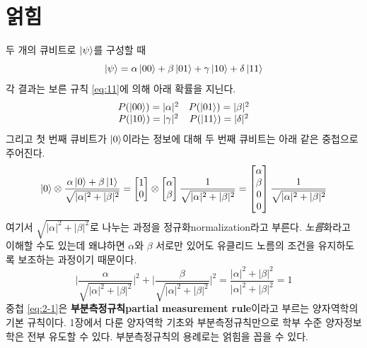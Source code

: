 \documentclass[a4paper,chapter,atbegshi]{oblivoir}
\begin{document}
\chapter{얽힘}
두 개의 큐비트로 $\ket{\psi}$를 구성할 때
\[
  \ket{\psi} = \alpha\ket{00}+\beta\ket{01}+\gamma\ket{10}+\delta\ket{11}
\]
각 결과는 보른 규칙 \ref{eq:11}에 의해 아래 확률을 지닌다. 
\[\begin{matrix}
  P(\ket{00})=|\alpha|^2 & P(\ket{01})=|\beta|^2 \\
  P(\ket{10})=|\gamma|^2 & P(\ket{11})=|\delta|^2
\end{matrix}\]
그리고 첫 번째 큐비트가 $\ket{0}$이라는 정보에 대해 두 번째 큐비트는 아래
같은 중첩으로 주어진다.
\begin{equation}\label{eq:2-1}
  \ket0\otimes\frac{\alpha\ket0+\beta\ket1}{\sqrt{|\alpha|^2+|\beta|^2}}
  = \begin{bmatrix}1\\0\end{bmatrix}\otimes
  \begin{bmatrix}\alpha\\\beta\end{bmatrix}\frac{1}{\sqrt{|\alpha|^2+|\beta|^2}}
  = \begin{bmatrix}\alpha\\\beta\\0\\0\end{bmatrix}\frac{1}{\sqrt{|\alpha|^2+|\beta|^2}}
\end{equation}
여기서 $\sqrt{|\alpha|^2+|\beta|^2}$로 나누는 과정을 
정규화{\tiny normalization}라고
부른다. \emph{노름}화라고 이해할 수도 있는데 왜냐하면 $\alpha$와 $\beta$ 서로만
있어도 유클리드 노름의 조건을 유지하도록 보조하는 과정이기 때문이다. 
\[
  \Bigg\lvert\frac{\alpha}{\sqrt{|\alpha|^2+|\beta|^2}}\Bigg\rvert^2 +
  \Bigg\lvert\frac{\beta}{\sqrt{|\alpha|^2+|\beta|^2}}\Bigg\rvert^2
  =
  \frac{|\alpha|^2+|\beta|^2}{|\alpha|^2+|\beta|^2}=1
\]
중첩 \ref{eq:2-1}은 \textbf{부분측정규칙\tiny partial measurement rule}이라고
부르는 양자역학의 기본 규칙이다. 1장에서 다룬 양자역학 기초와 부분측정규칙만으로
학부 수준 양자정보학은 전부 유도할 수 있다. 부분측정규칙의 용례로는
얽힘을 꼽을 수 있다.
\end{document}
